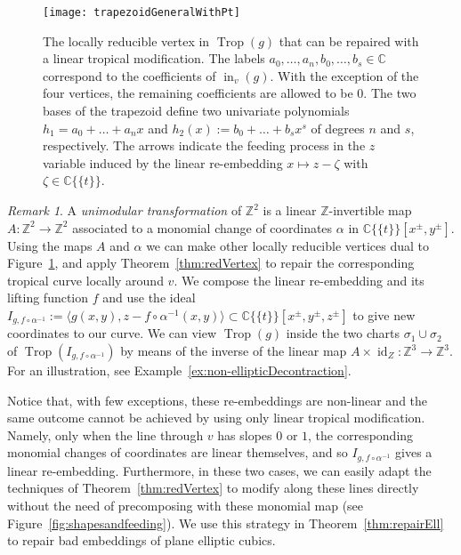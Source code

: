 \documentclass[11pt]{amsart}
\numberwithin{equation}{section}
\theoremstyle{plain}
\theoremstyle{definition}
\theoremstyle{remark}
\newtheorem{remark}[theorem]{Remark}
\begin{document}
\begin{figure}[htb]
\texttt{[image: trapezoidGeneralWithPt]}
\caption{The locally reducible vertex in $\operatorname{Trop}(g)$ that can be
  repaired with a linear tropical modification.  The labels
  $a_0,\ldots, a_n, b_0, \ldots, b_s \in {\mathbb{C}}$ correspond to the
  coefficients of $\operatorname{in}_v(g)$.  With the exception of the four
  vertices, the remaining coefficients are allowed to be 0. The two
  bases of the trapezoid define two univariate polynomials
  $h_1=a_0+\ldots +a_n x$ and $h_2(x):=b_0+\ldots+b_s x^s$ of degrees
  $n$ and $s$, respectively. The arrows indicate the feeding process
  in the $z$ variable induced by the linear re-embedding $x\mapsto
  z-{\zeta}$ with ${\zeta}\in {{\mathbb{C}}\{\!\{t
\}\!\}}$.  }\label{fig:trapezoid}
\end{figure}

\begin{remark}\label{rem:unimodular}
  A \emph{unimodular transformation} of ${\mathbb{Z}}^2$ is a linear
  ${\mathbb{Z}}$-invertible map $A\colon{\mathbb{Z}}^2\to {\mathbb{Z}}^2$ associated to a
  monomial change of coordinates $\alpha$ in ${{\mathbb{C}}\{\!\{t
\}\!\}}[x^{\pm},y^{\pm}]$.
  Using the maps $A$ and $\alpha$ we can make other locally reducible
  vertices dual to Figure~\ref{fig:trapezoid}, and apply
  Theorem~\ref{thm:redVertex} to repair the corresponding tropical
  curve locally around $v$.  We compose the linear re-embedding and
  its lifting function $f$ and use the ideal $I_{g,f\circ
    \alpha^{-1}}:=\langle g(x,y), z-f\circ\alpha^{-1}(x,y)\rangle
  \subset {{\mathbb{C}}\{\!\{t
\}\!\}}[x^{\pm},y^{\pm}, z^{\pm}]$ to give new coordinates to
  our curve. We can view $\operatorname{Trop}(g)$ inside the two charts
  $\sigma_1\cup\sigma_2$ of $\operatorname{Trop}(I_{g,f\circ\alpha^{-1}})$ by means
  of the inverse of the linear map $A\times \operatorname{id}_Z:{\mathbb{Z}}^3\to {\mathbb{Z}}^3$. For
  an illustration, see Example~\ref{ex:non-ellipticDecontraction}.

Notice that, with few exceptions, these re-embeddings are non-linear and the same outcome cannot be achieved by using only linear tropical modification. Namely, only when the line through $v$ has slopes $0$ or $1$, the corresponding monomial changes of coordinates are linear themselves, and so $I_{g,f\circ\alpha^{-1}}$ gives a linear re-embedding. Furthermore, in these two cases, we can easily adapt the techniques of Theorem~\ref{thm:redVertex} to modify along these lines directly without the need of precomposing with these monomial map  (see Figure~\ref{fig:shapesandfeeding}).   We use this strategy in  Theorem~\ref{thm:repairEll} to repair bad embeddings of plane elliptic  cubics. 
\end{remark}
\end{document}
